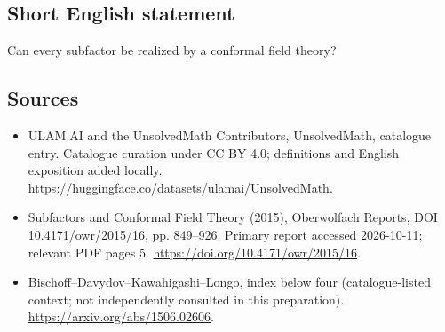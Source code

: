 \documentclass[11pt]{article}
\begin{document}
\subsection{Short English statement}
Can every subfactor be realized by a conformal field theory?
\subsection{Sources}
\begin{itemize}
\item[\hypertarget{source:statement:1}{S1}] ULAM.AI and the UnsolvedMath Contributors, UnsolvedMath, catalogue entry. Catalogue curation under CC BY 4.0; definitions and English exposition added locally.
\url{https://huggingface.co/datasets/ulamai/UnsolvedMath}.
\item[\hypertarget{source:statement:2}{S2}] Subfactors and Conformal Field Theory (2015), Oberwolfach Reports, DOI 10.4171/owr/2015/16, pp. 849--926. Primary report accessed 2026-10-11; relevant PDF pages 5.
\url{https://doi.org/10.4171/owr/2015/16}.
\item[\hypertarget{source:statement:3}{S3}] Bischoff--Davydov--Kawahigashi--Longo, index below four (catalogue-listed context; not independently consulted in this preparation).
\url{https://arxiv.org/abs/1506.02606}.
\end{itemize}
\label{end:statement}
\end{document}
